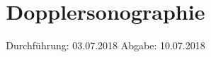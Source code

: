 

\subject{VERSUCH US3}
\title{Dopplersonographie}
\date{%
  Durchführung: 03.07.2018
  \hspace{3em}
  Abgabe: 10.07.2018
}



\maketitle
\thispagestyle{empty}
\tableofcontents
\newpage







\printbibliography{}


